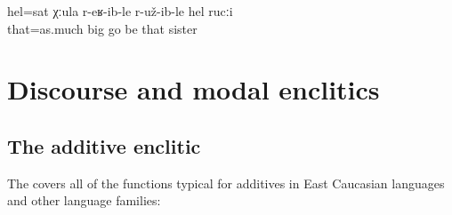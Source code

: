 \begin{exe}
	\ex	\label{ex:‎[‎‎From her small finger he pulled out his parents], so big was his sister}
	\gll	hel=sat	χːula	r-eʁ-ib-le	r-už-ib-le	hel	rucːi\\
		that=as.much	big	go	be	that	sister\\
	\glt	{}
\end{exe}




\section{Discourse and modal enclitics}
\label{sec:Discourse and modal enclitics}



\subsection{The additive enclitic}
\label{ssec:The additive enclitic}

The   covers all of the functions typical for additives in East Caucasian languages and other language families:

